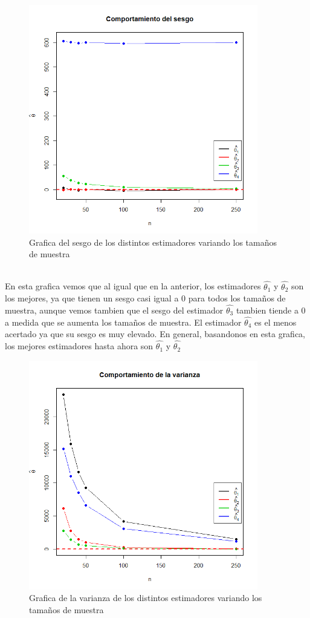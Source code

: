 \documentclass[letterpaper,12pt,onecolumn,titlepage]{article}
\begin{document}
\begin{figure}[!h]
    \begin{center}
        \includegraphics[width=10cm]{Figuras/S.png}
        \caption{Grafica del sesgo de los distintos estimadores variando los tama\~{n}os de muestra}
        \label{fig:Densidad}
    \end{center}
\end{figure}
~\\ En esta grafica vemos que al igual que en la anterior, los estimadores $\hat{\theta_1}$ y $\hat{\theta_2}$ son los mejores, ya que tienen un sesgo casi igual a 0 para todos los tama\~{n}os de muestra, aunque vemos tambien que el sesgo del estimador $\hat{\theta_3}$ tambien tiende a 0 a medida que se aumenta los tama\~{n}os de muestra. El estimador $\hat{\theta_4}$ es el menos acertado ya que su sesgo es muy elevado. En general, basandonos en esta grafica, los mejores estimadores hasta ahora son $\hat{\theta_1}$ y $\hat{\theta_2}$
\pagebreak \begin{figure}[!h]
    \begin{center}
        \includegraphics[width=10cm]{Figuras/V.png}
        \caption{Grafica de la varianza de los distintos estimadores variando los tama\~{n}os de muestra}
        \label{fig:Densidad}
    \end{center}
\end{figure}
\end{document}
